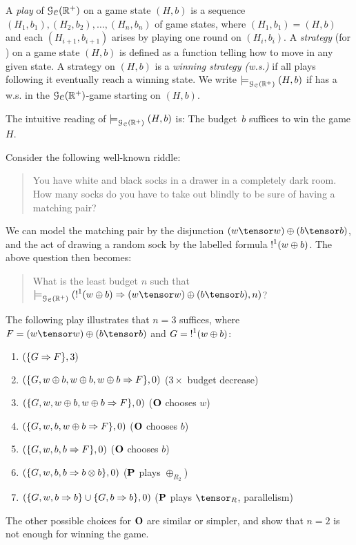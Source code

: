 \begin{definition}
A {\em play} of $\mathcal{G}_{\mathcal{C}}(\mathbb{R}^+)$ on a game state $(H,b)$ is a sequence $(H_1,b_1),(H_2,b_2),\ldots,(H_n,b_n)$ of game states, where $(H_1,b_1)=(H,b)$ and each $(H_{i+1},b_{i+1})$ arises by playing one round on $(H_i,b_i)$.
 A {\em strategy} (for \I) on a game state $(H,b)$ is defined as a function telling \I how to move in any given state. 
 A strategy on $(H,b)$ is a {\em winning strategy (w.s.)} if all plays following it eventually reach a winning state.
We write $\models^{}_{\mathcal{G}_{\mathcal{C}}(\mathbb{R}^+)}(H,b)$ if \I has a w.s. in the $\mathcal{G}_{\mathcal{C}}(\mathbb{R}^+)$-game starting on $(H,b)$. 
\end{definition}
The intuitive reading of $\models^{}_{\mathcal{G}_{\mathcal{C}}(\mathbb{R}^+)}(H,b)$ is: The budget~$b$ suffices to win the game $H$.

\begin{example}\label{ex:riddle}
Consider the following well-known riddle:
\begin{quote}
You have white and black socks in a drawer in a completely dark room. How many socks do you have to take out blindly to be sure of having a matching pair? 
\end{quote}
We can model the matching pair by the disjunction $(w\tensor w)\oplus(b\tensor b)$, and the act of drawing a random sock by the labelled formula $\hbox{$\mathop{!}^{1}$}(w\oplus b)$. The above question then becomes:
\begin{quote}
What is the least budget $n$  such that $\wins{}{\GAIMALLR}(\nbang{1}(w\oplus b)\seq (w\tensor w)\oplus(b\tensor b),n)$?
\end{quote}
The following play illustrates that $n=3$ suffices, where $F=(w\tensor w)\oplus(b\tensor b)$ and $G=\hbox{$\mathop{!}^{1}$}(w\oplus b)$:
\begin{enumerate}
\item $(\{G\Rightarrow F\},3)$ 
\item $(\{G, w\oplus b, w\oplus b, w\oplus b\Rightarrow F\},0)$ ($3\times$ budget decrease)
\item $(\{G, w, w\oplus b, w\oplus b\Rightarrow F\},0)$ ($\mathbf{O}$ chooses $w$)
\item $(\{G, w, b, w\oplus b\Rightarrow F\},0)$ ($\mathbf{O}$ chooses $b$)
\item $(\{G, w, b, b\Rightarrow F\},0)$ ($\mathbf{O}$ chooses $b$)
\item $(\{G, w, b, b\Rightarrow b\otimes b\},0)$  ($\mathbf{P}$ plays $\oplus_{R_2}$)
\item $(\{G, w, b\Rightarrow b\}\cup \{G, b\Rightarrow b\},0)$ ($\mathbf{P}$ plays $\tensor_R$, parallelism)
\end{enumerate}
The other possible choices for $\mathbf{O}$ are similar or simpler, and show that $n=2$ is not enough for winning the game.
\end{example}
